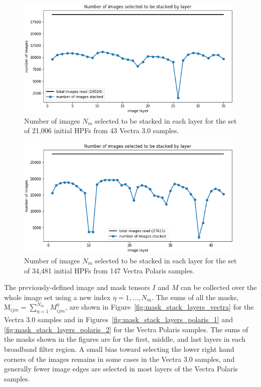 \documentclass[letterpaper,11pt]{article}
\newcommand{\reffig}[1]{Figure~\ref{#1}}
\newcommand{\Mu}{\mathrm{M}}
\begin{document}
\begin{figure}[!ht]
\centering
\includegraphics[width=0.98\textwidth]{images/measuring_flatfield_corrections/n_images_stacked_per_layer_vectra}
\caption{\footnotesize Number of images $N_{m}$ selected to be stacked in each layer for the set of 21,006 initial HPFs from 43 Vectra 3.0 samples.}
\label{fig:n_images_stacked_by_layer_vectra}
\end{figure}

\begin{figure}[!ht]
\centering
\includegraphics[width=0.98\textwidth]{images/measuring_flatfield_corrections/n_images_stacked_per_layer_polaris}
\caption{\footnotesize Number of images $N_{m}$ selected to be stacked in each layer for the set of 34,481 initial HPFs from 147 Vectra Polaris samples.}
\label{fig:n_images_stacked_by_layer_polaris}
\end{figure}

The previously-defined image and mask tensors $I$ and $M$ can be collected over the whole image set using a new index $\eta=1,\ldots,N_{m}$. The sums of all the masks, $\Mu_{ijm} = \sum_{\eta=1}^{N_{m}} M^{\eta}_{ijm}$, are shown in \reffig{fig:mask_stack_layers_vectra} for the Vectra 3.0 samples and in Figures~\ref{fig:mask_stack_layers_polaris_1} and \ref{fig:mask_stack_layers_polaris_2} for the Vectra Polaris samples. The sums of the masks shown in the figures are for the first, middle, and last layers in each broadband filter region. A small bias toward selecting the lower right hand corners of the images remains in some cases in the Vectra 3.0 samples, and generally fewer image edges are selected in most layers of the Vectra Polaris samples. 
\end{document}
